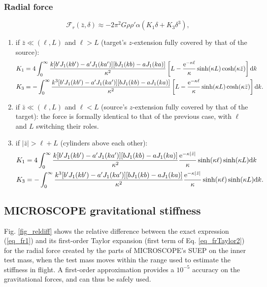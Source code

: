 \documentclass[12pt]{iopart}
\begin{document}
\subsubsection{Radial force}

\begin{equation} \label{eq_frTaylor2}
{\mathcal F}_r(\bar{z}, \delta) \approx -2\pi^2 G \rho \rho' \alpha (K_1 \delta + K_3 \delta^3),
\end{equation}

\begin{enumerate}
\item if $\bar{z}\ll(\ell,L)$ and $\ell > L$ (target's $z$-extension fully covered by that of the source):
\begin{align}
K_1 &= 4 \int_0^\infty \frac{k [b'J_1(kb') - a'J_1(ka')] [bJ_1(kb) - aJ_1(ka)]}{\kappa^2} \left[ L - \frac{{\rm e}^{-\kappa \ell}}{\kappa} \sinh(\kappa L) \cosh(\kappa \bar{z})\right] {\rm d}k \\
K_3 &= -\int_0^\infty \frac{k^3 [b'J_1(kb') - a'J_1(ka')] [bJ_1(kb) - aJ_1(ka)]}{\kappa^2} \left[ L - \frac{{\rm e}^{-\kappa \ell}}{\kappa} \sinh(\kappa L) \cosh(\kappa \bar{z})\right] {\rm d}k.
\end{align}

\item if $\bar{z}\ll(\ell,L)$ and $\ell < L$ (source's $z$-extension fully covered by that of the target): the force is formally identical to that of the previous case, with $\ell$ and $L$ switching their roles.

\item if $|\bar{z}| > \ell + L$ (cylinders above each other):
\begin{align}
K_1 &= 4 \int_0^\infty \frac{k [b'J_1(kb') - a'J_1(ka')] [bJ_1(kb) - aJ_1(ka)]}{\kappa^2} \frac{{\rm e}^{-\kappa |\bar{z}|}}{\kappa} \sinh(\kappa \ell) \sinh(\kappa L) {\rm d}k \\
K_3 &= -\int_0^\infty \frac{k^3 [b'J_1(kb') - a'J_1(ka')] [bJ_1(kb) - aJ_1(ka)]}{\kappa^2} \frac{{\rm e}^{-\kappa |\bar{z}|}}{\kappa} \sinh(\kappa \ell) \sinh(\kappa L) {\rm d}k.
\end{align}
\end{enumerate}


\subsection{MICROSCOPE gravitational stiffness}

Fig. \ref{fig_reldiff} shows the relative difference between the exact expression (\ref{eq_fr1}) and its first-order Taylor expansion (first term of Eq. \ref{eq_frTaylor2}) for the radial force created by the parts of MICROSCOPE's SUEP on the inner test mass, when the test mass moves within the range used to estimate the stiffness in flight. A first-order approximation provides a $10^{-5}$ accuracy on the gravitational forces, and can thus be safely used.
\end{document}
